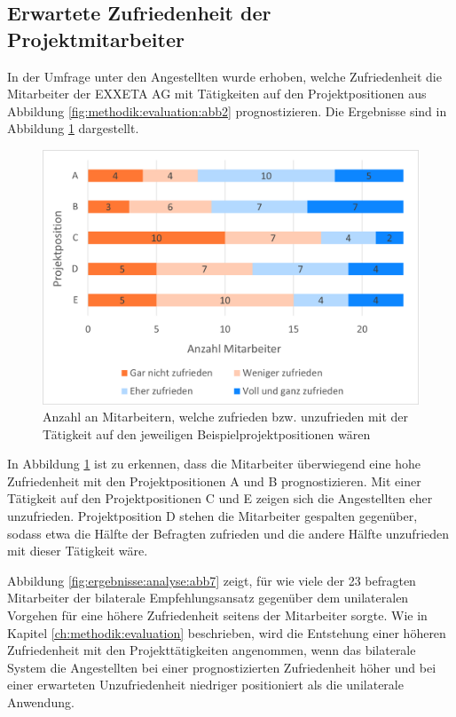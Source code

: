 \subsection{Erwartete Zufriedenheit der Projektmitarbeiter}
\label{ch:ergebnisse:fallstudie:umfrageMitarbeiter}
In der Umfrage unter den Angestellten wurde erhoben, welche Zufriedenheit die Mitarbeiter der EXXETA AG mit Tätigkeiten auf den Projektpositionen aus Abbildung \ref{fig:methodik:evaluation:abb2} prognostizieren. Die Ergebnisse sind in Abbildung \ref{fig:ergebnisse:fallstudie:abb1} dargestellt.

\begin{figure}[h]
	\centering
	\includegraphics[width=1\textwidth]{gfx/mitarbeiter-zufriedenheit-umfrage.png}
	\caption{Anzahl an Mitarbeitern, welche zufrieden bzw. unzufrieden mit der Tätigkeit auf den jeweiligen Beispielprojektpositionen wären}
	\label{fig:ergebnisse:fallstudie:abb1}
\end{figure}

In Abbildung \ref{fig:ergebnisse:fallstudie:abb1} ist zu erkennen, dass die Mitarbeiter überwiegend eine hohe Zufriedenheit mit den Projektpositionen A und B prognostizieren. Mit einer Tätigkeit auf den Projektpositionen C und E zeigen sich die Angestellten eher unzufrieden. Projektposition D stehen die Mitarbeiter gespalten gegenüber, sodass etwa die Hälfte der Befragten zufrieden und die andere Hälfte unzufrieden mit dieser Tätigkeit wäre.

Abbildung \ref{fig:ergebnisse:analyse:abb7} zeigt, für wie viele der 23 befragten Mitarbeiter der bilaterale Empfehlungsansatz gegenüber dem unilateralen Vorgehen für eine höhere Zufriedenheit seitens der Mitarbeiter sorgte. Wie in Kapitel \ref{ch:methodik:evaluation} beschrieben, wird die Entstehung einer höheren Zufriedenheit mit den Projekttätigkeiten angenommen, wenn das bilaterale System die Angestellten bei einer prognostizierten Zufriedenheit höher und bei einer erwarteten Unzufriedenheit niedriger positioniert als die unilaterale Anwendung.


